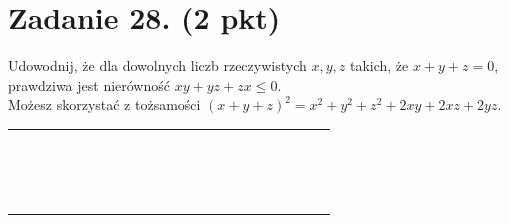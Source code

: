 \documentclass[10pt]{article}
\begin{document}
\section*{Zadanie 28. (2 pkt)}
Udowodnij, że dla dowolnych liczb rzeczywistych \(x, y, z\) takich, że \(x+y+z=0\), prawdziwa jest nierówność \(x y+y z+z x \leq 0\).\\
Możesz skorzystać z tożsamości \((x+y+z)^{2}=x^{2}+y^{2}+z^{2}+2 x y+2 x z+2 y z\).

\begin{center}
\begin{tabular}{|c|c|c|c|c|c|c|c|c|c|c|c|c|c|c|c|c|c|c|c|c|c|c|}
\hline
 &  &  &  &  &  &  &  &  &  &  &  &  &  &  &  &  &  &  &  &  &  &  \\
\hline
 &  &  &  &  &  &  &  &  &  &  &  &  &  &  &  &  &  &  &  &  &  &  \\
\hline
 &  &  &  &  &  &  &  &  &  &  &  &  &  &  &  &  &  &  &  &  &  &  \\
\hline
 &  &  &  &  &  &  &  &  &  &  &  &  &  &  &  &  &  &  &  &  &  &  \\
\hline
 &  &  &  &  &  &  &  &  &  &  &  &  &  &  &  &  &  &  &  &  &  &  \\
\hline
 &  &  &  &  &  &  &  &  &  &  &  &  &  &  &  &  &  &  &  &  &  &  \\
\hline
 &  &  &  &  &  &  &  &  &  &  &  &  &  &  &  &  &  &  &  &  &  &  \\
\hline
 &  &  &  &  &  &  &  &  &  &  &  &  &  &  &  &  &  &  &  &  &  &  \\
\hline
 &  &  &  &  &  &  &  &  &  &  &  &  &  &  &  &  &  &  &  &  &  &  \\
\hline
 &  &  &  &  &  &  &  &  &  &  &  &  &  &  &  &  &  &  &  &  &  &  \\
\hline
 &  &  &  &  &  &  &  &  &  &  &  &  &  &  &  &  &  &  &  &  &  &  \\
\hline
 &  &  &  &  &  &  &  &  &  &  &  &  &  &  &  &  &  &  &  &  &  &  \\
\hline
 &  &  &  &  &  &  &  &  &  &  &  &  &  &  &  &  &  &  &  &  &  &  \\
\hline
 &  &  &  &  &  &  &  &  &  &  &  &  &  &  &  &  &  &  &  &  &  &  \\
\hline
 &  &  &  &  &  &  &  &  &  &  &  &  &  &  &  &  &  &  &  &  &  &  \\
\hline
 &  &  &  &  &  &  &  &  &  &  &  &  &  &  &  &  &  &  &  &  &  &  \\
\hline
 &  &  &  &  &  &  &  &  &  &  &  &  &  &  &  &  &  &  &  &  &  &  \\

\end{tabular}
\end{center}
\end{document}
